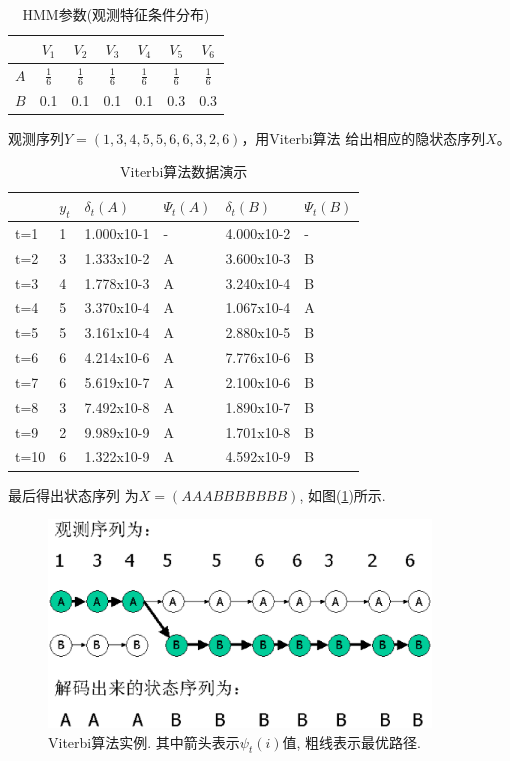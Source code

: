 \begin{table}
\centering
   \begin{tabular}{|c|c|c|c|c|c|c|}
     \hline
     & $V_1$ & $V_2$ & $V_3$ & $V_4$ & $V_5$ & $V_6$\\
      \hline
         $A $ & $\frac{1}{6}$ & $\frac{1}{6}$ & $\frac{1}{6}$ & $\frac{1}{6}$ & $\frac{1}{6}$ & $\frac{1}{6}$\\
      \hline
         $B$ & 0.1 & 0.1  & 0.1 & 0.1 & 0.3 & 0.3\\
      \hline
   \end{tabular}
\caption{HMM参数(观测特征条件分布)}
\end{table}

观测序列$Y=(1, 3, 4, 5,5 , 6, 6,3,2,6)$，用Viterbi算法
给出相应的隐状态序列$X$。
\begin{table}
\centering
\begin{tabular}{|ll||ll||ll|}
\hline
   & $y_t$  & $\delta_t(A)$ & $\Psi_t(A)$ &  $\delta_t(B)$ & $ \Psi_t(B)$\\
\hline
t=1 & 1 &   1.000x10-1 &  - & 4.000x10-2 & -\\
t=2 & 3 &   1.333x10-2 &  A & 3.600x10-3 & B\\
t=3 & 4 &   1.778x10-3 & A & 3.240x10-4 & B\\
t=4 & 5 &   3.370x10-4 & A & 1.067x10-4 & A\\
t=5 & 5 &   3.161x10-4 & A & 2.880x10-5 & B\\
t=6 & 6  &  4.214x10-6 & A & 7.776x10-6 & B\\
t=7 & 6 &   5.619x10-7 & A & 2.100x10-6 & B\\
t=8 & 3  &  7.492x10-8 & A & 1.890x10-7 & B\\
t=9 & 2 &   9.989x10-9 & A & 1.701x10-8 & B\\
t=10  &   6 &   1.322x10-9 & A & 4.592x10-9 & B\\
\hline
\end{tabular}
\caption{Viterbi算法数据演示}
\end{table}
最后得出状态序列 为$X=(AAABBBBBBB)$, 如图(\ref{Fig:ViterbiPath})所示.
\begin{figure}[ht]
\centering
\includegraphics[width=4in]{ViterbiPath.eps}
\caption[]{Viterbi算法实例. 其中箭头表示$\psi_{t}(i)$值, 粗线表示最优路径.}
\label{Fig:ViterbiPath}
\end{figure}

